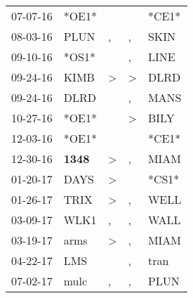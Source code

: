 \begin{supertabular}{p{0.07\textwidth}p{0.06\textwidth}p{0.02\textwidth}p{0.02\textwidth}p{0.06\textwidth}}
          07-07-16\textsuperscript{} &                            *OE1* &                  &                  &                            *CE1* \\
          08-03-16\textsuperscript{} &           PLUN\textsuperscript{} &                , &                , &           SKIN\textsuperscript{} \\
          09-10-16\textsuperscript{} &                            *OS1* &                  &                , &           LINE\textsuperscript{} \\
          09-24-16\textsuperscript{} &           KIMB\textsuperscript{} &     \textgreater &     \textgreater &           DLRD\textsuperscript{} \\
          09-24-16\textsuperscript{} &           DLRD\textsuperscript{} &                  &                , &           MANS\textsuperscript{} \\
          10-27-16\textsuperscript{} &                            *OE1* &                  &     \textgreater &           BILY\textsuperscript{} \\
          12-03-16\textsuperscript{} &                            *OE1* &                  &                  &                            *CE1* \\
          12-30-16\textsuperscript{} &  \textbf{1348\textsuperscript{}} &     \textgreater &                , &           MIAM\textsuperscript{} \\
          01-20-17\textsuperscript{} &           DAYS\textsuperscript{} &     \textgreater &                  &                            *CS1* \\
          01-26-17\textsuperscript{} &           TRIX\textsuperscript{} &     \textgreater &                , &           WELL\textsuperscript{} \\
          03-09-17\textsuperscript{} &           WLK1\textsuperscript{} &                , &                , &           WALL\textsuperscript{} \\
          03-19-17\textsuperscript{} &           arms\textsuperscript{} &     \textgreater &                , &           MIAM\textsuperscript{} \\
          04-22-17\textsuperscript{} &            LMS\textsuperscript{} &                  &                , &           tran\textsuperscript{} \\
          07-02-17\textsuperscript{} &           mulc\textsuperscript{} &                , &                , &           PLUN\textsuperscript{} \\

\end{supertabular}
